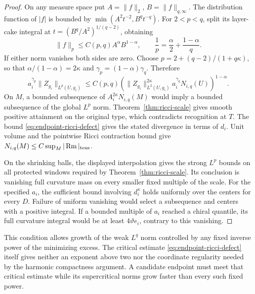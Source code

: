\begin{proof}
On any measure space put \(A=\|f\|_2\), \(B=\|f\|_{q,\infty}\).
The distribution function of \(|f|\) is bounded by
\(\min(A^2t^{-2},B^qt^{-q})\). For \(2<p<q\), split its
layer-cake integral at \(t=(B^q/A^2)^{1/(q-2)}\), obtaining
\[
 \|f\|_p\le C(p,q)A^\alpha B^{1-\alpha},\qquad
 \frac1p=\frac{\alpha}{2}+\frac{1-\alpha}{q} .
\]
If either norm vanishes both sides are zero. Choose
\(p=2+(q-2)/(1+q\kappa)\), so that
\(\alpha/(1-\alpha)=2\kappa\) and
\(\gamma_p=(1-\alpha)\gamma_q\). Therefore
\[
 a_i^{\gamma_p}\|Z_{g_i}\|_{L^p(U,g_i)}
 \le C(p,q)\left(\|Z_{g_i}\|_{L^2(U,g_i)}^{2\kappa}
          a_i^{\gamma_q}N_{i,q}(U)\right)^{1-\alpha} .
\]
On \(M\), a bounded subsequence of \(A_i^{2\kappa}N_{i,q}(M)\)
would imply a bounded subsequence of the global \(L^p\) norm.
Theorem~\ref{thm:ricci-scale}
gives smooth positive attainment on the original type, which
contradicts recognition at \(T\). The bound
\eqref{eq:endpoint-ricci-defect} gives the stated divergence in
terms of \(d_i\). Unit volume and the pointwise
Ricci contraction bound give \(N_{i,q}(M)\le C\sup_M|\operatorname{Rm}|_{\rm tens}\).

On the shrinking balls, the displayed interpolation gives the
strong \(L^p\) bounds on all protected windows required by Theorem~\ref{thm:ricci-scale}.
Its conclusion is vanishing full curvature mass on every smaller
fixed multiple of the scale. For the specified \(a_i\), the
sufficient bound involving \(d_i^\kappa\) holds uniformly over
the centers for every \(D\). Failure of uniform vanishing would
select a subsequence and centers with a positive integral. If a
bounded multiple of \(a_i\) reached a chiral quantile, its full
curvature integral would be at least \(4\vartheta e_i\), contrary
to this vanishing.
\end{proof}

This condition allows growth of the weak \(L^q\) norm controlled
by any fixed inverse power of the minimizing excess. The
critical estimate \eqref{eq:endpoint-ricci-defect} itself gives
neither an exponent above two nor the coordinate regularity
needed by the harmonic compactness argument. A candidate endpoint
must meet that critical estimate while its supercritical norms
grow faster than every such fixed power.
